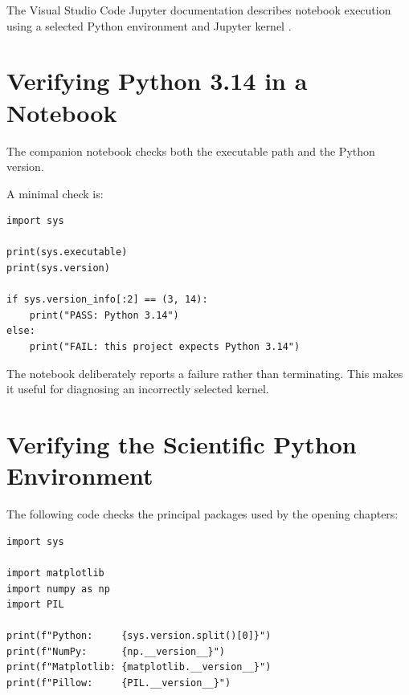 The Visual Studio Code Jupyter documentation describes notebook
execution using a selected Python environment and Jupyter kernel
\cite{vscode_jupyter}.


\section{Verifying Python 3.14 in a Notebook}
\label{sec:verify-python-version}

The companion notebook checks both the executable path and the Python
version.

A minimal check is:

\begin{listing}[htbp]
    \caption{Checking the Python release used by a notebook.}
    \label{lst:check-python-version}

\begin{verbatim}
import sys

print(sys.executable)
print(sys.version)

if sys.version_info[:2] == (3, 14):
    print("PASS: Python 3.14")
else:
    print("FAIL: this project expects Python 3.14")
\end{verbatim}

\end{listing}

The notebook deliberately reports a failure rather than terminating.
This makes it useful for diagnosing an incorrectly selected kernel.


\section{Verifying the Scientific Python Environment}
\label{sec:verify-environment}

The following code checks the principal packages used by the opening
chapters:

\begin{listing}[htbp]
    \caption{Verifying the principal scientific Python dependencies.}
    \label{lst:verify-environment}

\begin{verbatim}
import sys

import matplotlib
import numpy as np
import PIL

print(f"Python:     {sys.version.split()[0]}")
print(f"NumPy:      {np.__version__}")
print(f"Matplotlib: {matplotlib.__version__}")
print(f"Pillow:     {PIL.__version__}")
\end{verbatim}

\end{listing}


